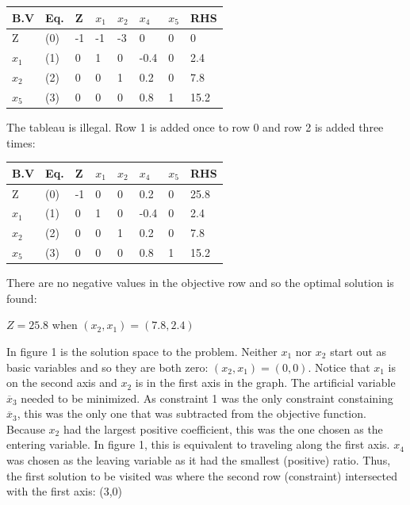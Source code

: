 \documentclass{article}
\begin{document}
\vspace{5mm}
\begin{tabular}{|l|l|l|l l l l|l|}
  \hline
  B.V             & Eq. & Z & $x_1$ & $x_2$ & $x_4$ & $x_5$  & RHS\\ \hline
  Z               & (0) & -1& -1 & -3 & 0  & 0   & 0    \\ \hline
  $x_1$           & (1) & 0 & 1  & 0  &-0.4& 0   & 2.4  \\ \hline
  $x_2$           & (2) & 0 & 0  & 1  & 0.2& 0   & 7.8 \\ \hline
  $x_5$           & (3) & 0 & 0  &  0 & 0.8& 1   & 15.2 \\ \hline
\end{tabular}

\vspace{5mm}
The tableau is illegal. Row 1 is added once to row 0 and row 2 is added three times:

\vspace{5mm}
\begin{tabular}{|l|l|l|l l l l|l|}
  \hline
  B.V             & Eq. & Z & $x_1$ & $x_2$ & $x_4$ & $x_5$  & RHS\\ \hline
  Z               & (0) & -1& 0 & 0 & 0.2  & 0   & 25.8    \\ \hline
  $x_1$           & (1) & 0 & 1  & 0  &-0.4& 0   & 2.4  \\ \hline
  $x_2$           & (2) & 0 & 0  & 1  & 0.2& 0   & 7.8 \\ \hline
  $x_5$           & (3) & 0 & 0  &  0 & 0.8& 1   & 15.2 \\ \hline
\end{tabular}

\vspace{5mm}
There are no negative values in the objective row and so the optimal solution is found:

$Z=25.8$ when $(x_2,x_1)=(7.8, 2.4)$

\vspace{10mm}
In figure 1 is the solution space to the problem. 
Neither $x_1$ nor $x_2$ start out as basic variables and so they are both zero: $(x_2,x_1)=(0,0)$.
Notice that $x_1$ is on the second axis and $x_2$ is in the first axis in the graph.
The artificial variable $\overline{x}_3$ needed to be minimized. 
As constraint 1 was the only constraint constaining $\overline{x}_3$, this was the only one that was subtracted from the objective function.
Because $x_2$ had the largest positive coefficient, this was the one chosen as the entering variable.
In figure 1, this is equivalent to traveling along the first axis.
$x_4$ was chosen as the leaving variable as it had the smallest (positive) ratio.
Thus, the first solution to be visited was where the second row (constraint) intersected with the first axis: (3,0)
\end{document}

